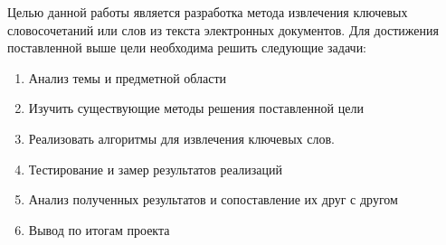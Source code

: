 Целью данной работы является разработка метода извлечения ключевых словосочетаний или слов из текста электронных документов.
Для достижения поставленной выше цели необходима решить следующие задачи:

\begin{enumerate}
	\item Анализ темы и предметной области
	\item Изучить существующие методы решения поставленной цели
	\item Реализовать алгоритмы для извлечения ключевых слов.
	\item Тестирование и замер результатов реализаций
	\item Анализ полученных результатов и сопоставление их друг с другом
	\item Вывод по итогам проекта
\end{enumerate}